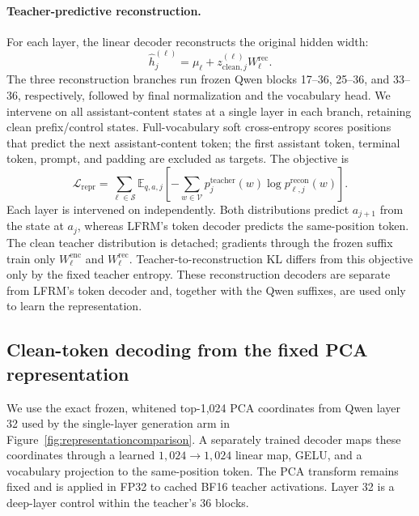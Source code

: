 \documentclass{article}
\newcommand{\E}{\mathbb{E}}
\begin{document}
\paragraph{Teacher-predictive reconstruction.}
For each layer, the linear decoder reconstructs the original hidden width:
\begin{equation}
 \widehat h_j^{(\ell)}=\mu_\ell+z_{\mathrm{clean},j}^{(\ell)}W_\ell^{\mathrm{rec}}.
 \label{eq:representationreconstruction}
\end{equation}
The three reconstruction branches run frozen Qwen blocks 17--36, 25--36, and 33--36, respectively, followed by final normalization and the vocabulary head. We intervene on all assistant-content states at a single layer in each branch, retaining clean prefix/control states. Full-vocabulary soft cross-entropy scores positions that predict the next assistant-content token; the first assistant token, terminal token, prompt, and padding are excluded as targets. The objective is
\begin{equation}
 \mathcal L_{\mathrm{repr}}
 =\sum_{\ell\in\mathcal S}\E_{q,a,j}
 \left[-\sum_{w\in\mathcal V}p_j^{\mathrm{teacher}}(w)
 \log p_{\ell,j}^{\mathrm{recon}}(w)\right].
 \label{eq:representationloss}
\end{equation}
Each layer is intervened on independently. Both distributions predict $a_{j+1}$ from the state at $a_j$, whereas LFRM's token decoder predicts the same-position token. The clean teacher distribution is detached; gradients through the frozen suffix train only $W_\ell^{\mathrm{enc}}$ and $W_\ell^{\mathrm{rec}}$. Teacher-to-reconstruction KL differs from this objective only by the fixed teacher entropy. These reconstruction decoders are separate from LFRM's token decoder and, together with the Qwen suffixes, are used only to learn the representation.

\subsection{Clean-token decoding from the fixed PCA representation}
\label{app:representationdiagnostics}
We use the exact frozen, whitened top-1,024 PCA coordinates from Qwen layer 32 used by the single-layer generation arm in Figure~\ref{fig:representationcomparison}. A separately trained decoder maps these coordinates through a learned $1{,}024\!\to\!1{,}024$ linear map, GELU, and a vocabulary projection to the same-position token. The PCA transform remains fixed and is applied in FP32 to cached BF16 teacher activations. Layer 32 is a deep-layer control within the teacher's 36 blocks.
\end{document}
